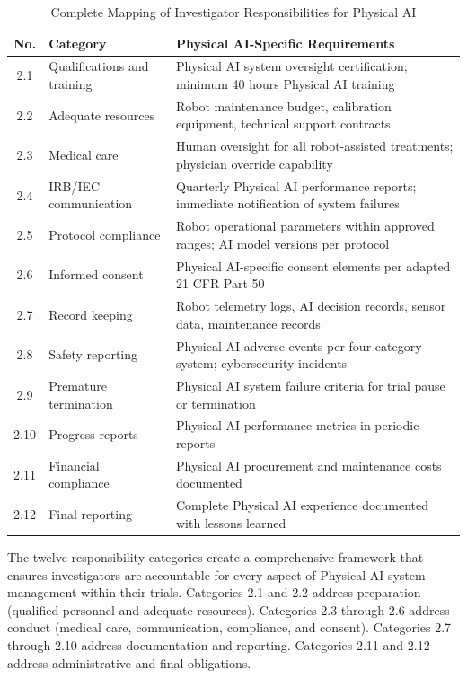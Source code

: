 \begin{table}[H]
\centering
\caption{Complete Mapping of Investigator Responsibilities for Physical AI}
\label{tab:ich-investigator-map}
\small
\begin{tabularx}{\textwidth}{c l X}
\toprule
\textbf{No.} & \textbf{Category} & \textbf{Physical AI-Specific Requirements} \\
\midrule
2.1 & Qualifications and training & Physical AI system oversight certification; minimum 40 hours Physical AI training \\
2.2 & Adequate resources & Robot maintenance budget, calibration equipment, technical support contracts \\
2.3 & Medical care & Human oversight for all robot-assisted treatments; physician override capability \\
2.4 & IRB/IEC communication & Quarterly Physical AI performance reports; immediate notification of system failures \\
2.5 & Protocol compliance & Robot operational parameters within approved ranges; AI model versions per protocol \\
2.6 & Informed consent & Physical AI-specific consent elements per adapted 21 CFR Part 50 \\
2.7 & Record keeping & Robot telemetry logs, AI decision records, sensor data, maintenance records \\
2.8 & Safety reporting & Physical AI adverse events per four-category system; cybersecurity incidents \\
2.9 & Premature termination & Physical AI system failure criteria for trial pause or termination \\
2.10 & Progress reports & Physical AI performance metrics in periodic reports \\
2.11 & Financial compliance & Physical AI procurement and maintenance costs documented \\
2.12 & Final reporting & Complete Physical AI experience documented with lessons learned \\
\bottomrule
\end{tabularx}
\end{table}

The twelve responsibility categories create a comprehensive framework that
ensures investigators are accountable for every aspect of Physical AI system
management within their trials. Categories 2.1 and 2.2 address preparation
(qualified personnel and adequate resources). Categories 2.3 through 2.6
address conduct (medical care, communication, compliance, and consent).
Categories 2.7 through 2.10 address documentation and reporting. Categories
2.11 and 2.12 address administrative and final obligations.
